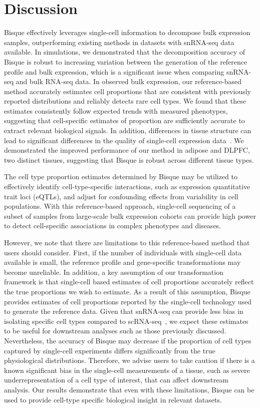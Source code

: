 \section{Discussion}

Bisque effectively leverages single-cell information to decompose bulk expression samples, outperforming existing methods in datasets with snRNA-seq data available. In simulations, we demonstrated that the decomposition accuracy of Bisque is robust to increasing variation between the generation of the reference profile and bulk expression, which is a significant issue when comparing snRNA-seq and bulk RNA-seq data. In observed bulk expression, our reference-based method accurately estimates cell proportions that are consistent with previously reported distributions and reliably detects rare cell types. We found that these estimates consistently follow expected trends with measured phenotypes, suggesting that cell-specific estimates of proportion are sufficiently accurate to extract relevant biological signals. In addition, differences in tissue structure can lead to significant differences in the quality of single-cell expression data~\cite{Nguyen2018-gv}. We demonstrated the improved performance of our method in adipose and DLPFC, two distinct tissues, suggesting that Bisque is robust across different tissue types.

The cell type proportion estimates determined by Bisque may be utilized to effectively identify cell-type-specific interactions, such as expression quantitative trait loci (eQTLs), and adjust for confounding effects from variability in cell populations. With this reference-based approach, single-cell sequencing of a subset of samples from large-scale bulk expression cohorts can provide high power to detect cell-specific associations in complex phenotypes and diseases. 

However, we note that there are limitations to this reference-based method that users should consider. First, if the number of individuals with single-cell data available is small, the reference profile and gene-specific transformations may become unreliable. In addition, a key assumption of our transformation framework is that single-cell based estimates of cell proportions accurately reflect the true proportions we wish to estimate. As a result of this assumption, Bisque provides estimates of cell proportions reported by the single-cell technology used to generate the reference data. Given that snRNA-seq can provide less bias in isolating specific cell types compared to scRNA-seq~\cite{Wu2019-pq,Bakken2018-nt}, we expect these estimates to be useful for downstream analyses such as those previously discussed. Nevertheless, the accuracy of Bisque may decrease if the proportion of cell types captured by single-cell experiments differs significantly from the true physiological distributions. Therefore, we advise users to take caution if there is a known significant bias in the single-cell measurements of a tissue, such as severe underrepresentation of a cell type of interest, that can affect downstream analysis. Our results demonstrate that even with these limitations, Bisque can be used to provide cell-type specific biological insight in relevant datasets.


